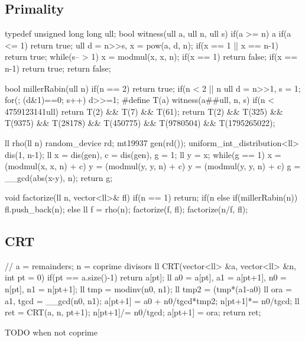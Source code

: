 \subsection{Primality}
\begin{cpp}
typedef unsigned long long ull;
bool witness(ull a, ull n, ull s){
  if(a >= n) a%
  if(a <= 1) return true;
  ull d = n>>s, x = pow(a, d, n);
  if(x == 1 || x == n-1) return true;
  while(s-- > 1){
    x = modmul(x, x, n);
    if(x == 1) return false;
    if(x == n-1) return true;
  }
  return false;
}

bool millerRabin(ull n){
  if(n == 2) return true;
  if(n < 2 || n%
  ull d = n>>1, s = 1;
  for(; (d&1)==0; s++) d>>=1;
#define T(a) witness(a##ull, n, s)
  if(n < 4759123141ull) return T(2) && T(7) && T(61);
  return T(2) && T(325) && T(9375) && T(28178)
    && T(450775) && T(9780504) && T(1795265022);
}

ll rho(ll n){
  random_device rd; mt19937 gen(rd());
  uniform_int_distribution<ll> dis(1, n-1);
  ll x = dis(gen), c = dis(gen), g = 1; ll y = x;
  while(g == 1){
    x = (modmul(x, x, n) + c) %
    y = (modmul(y, y, n) + c) %
    y = (modmul(y, y, n) + c) %
    g = __gcd(abs(x-y), n);
  }
  return g;
}

void factorize(ll n, vector<ll>& fl){
  if(n == 1) return;
  if(n%
  else if(millerRabin(n)) fl.push_back(n);
  else{
    ll f = rho(n);
    factorize(f, fl); factorize(n/f, fl);
  }
}
\end{cpp}

\subsection{CRT}
\begin{cpp}
// a = remainders; n = coprime divisors
ll CRT(vector<ll> &a, vector<ll> &n, int pt = 0){
    if(pt == a.size()-1) return a[pt];
    ll a0 = a[pt], a1 = a[pt+1], n0 = n[pt], n1 = n[pt+1];
    ll tmp = modinv(n0, n1);
    ll tmp2 = (tmp*(a1-a0) %
    ll ora = a1, tgcd = __gcd(n0, n1);
    a[pt+1] = a0 + n0/tgcd*tmp2;
    n[pt+1]*= n0/tgcd;
    ll ret = CRT(a, n, pt+1);
    n[pt+1]/= n0/tgcd;
    a[pt+1] = ora;
    return ret;
}
\end{cpp}

TODO when not coprime

